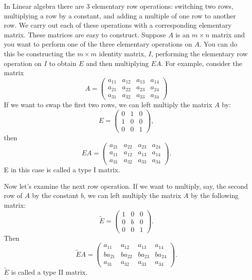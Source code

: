 \label{lab:LUdecomp}

In Linear algebra there are 3 elementary row operations: switching two rows, multiplying a row by a constant, and adding a multiple of one row to another row.  We carry out each of these operations with a corresponding elementary matrix.  These matrices are easy to construct. Suppose $A$ is an $m \times n$ matrix and you want to perform one of the three elementary operations on $A$. You can do this be constructing the $m \times m$ identity matrix, $I$, performing the elementary row operation on $I$ to obtain $E$ and then multiplying $EA$.  For example, consider the matrix
\[
A = \begin{pmatrix}
a_{11}&a_{12}&a_{13}&a_{14}\\
a_{21}&a_{22}&a_{23}&a_{24}\\
a_{31}&a_{32}&a_{33}&a_{34}
\end{pmatrix}
\]
If we want to swap the first two rows, we can left multiply the
matrix $A$ by:
\[
E = \begin{pmatrix}
0&1&0\\
1&0&0\\
0&0&1
\end{pmatrix},
\]
then
\[
E A =
\begin{pmatrix}
a_{21}&a_{22}&a_{23}&a_{24}\\
a_{11}&a_{12}&a_{13}&a_{14}\\
a_{31}&a_{32}&a_{33}&a_{34}
\end{pmatrix}.
\]
E in this case is called a type I matrix.

Now let's examine the next row operation.  If we want to multiply,
say, the second row of $A$ by the constant $b$, we can left multiply
the matrix $A$ by the following matrix:
\[
\tilde{E} = \begin{pmatrix}
1&0&0\\
0&b&0\\
0&0&1
\end{pmatrix}.
\]
Then
\[
\tilde{E} A =
\begin{pmatrix}
a_{11}&a_{12}&a_{13}&a_{14}\\
b a_{21}&b a_{22}&b a_{23}&b a_{24}\\
a_{31}&a_{32}&a_{33}&a_{34}
\end{pmatrix}.
\]
$\tilde{E}$ is called a type II matrix.  

